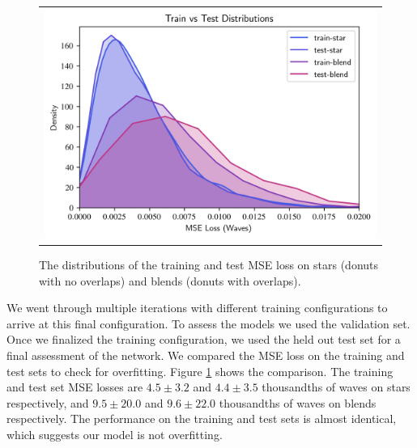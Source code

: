 \begin{figure}[!htbp]
\begin{center}
\begin{tabular}{c}
\includegraphics[width=\textwidth]{figs/cnn/train_vs_test.png}
\end{tabular}
\end{center}
\caption[Train Versus Test MSE Loss]{The distributions of the training and test MSE loss on stars (donuts with no overlaps) and blends (donuts with overlaps).\label{fig:train_vs_test}}
\end{figure}

We went through multiple iterations with different training configurations to arrive at this final configuration. To assess the models we used the validation set. Once we finalized the training configuration, we used the held out test set for a final assessment of the network. We compared the MSE loss on the training and test sets to check for overfitting. Figure \ref{fig:train_vs_test} shows the comparison. The training and test set MSE losses are $4.5\pm 3.2$ and $4.4\pm 3.5$ thousandths of waves on stars respectively, and $9.5\pm 20.0$ and $9.6\pm 22.0$ thousandths of waves on blends respectively. The performance on the training and test sets is almost identical, which suggests our model is not overfitting.

